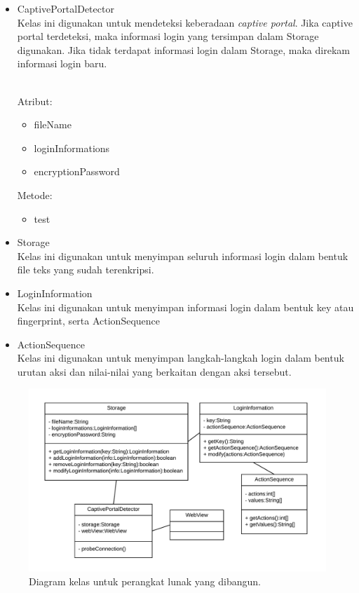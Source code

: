 \begin{itemize}
    \item{CaptivePortalDetector\\Kelas ini digunakan untuk mendeteksi keberadaan \textit{captive portal}. Jika captive portal terdeteksi, maka informasi login yang tersimpan dalam Storage digunakan. Jika tidak terdapat informasi login dalam Storage, maka direkam informasi login baru.}
    {
        \\Atribut:
        \begin{itemize}
            \item{fileName}
            \item{loginInformations}
            \item{encryptionPassword}
        \end{itemize}
        Metode:
        \begin{itemize}
            \item{test}
        \end{itemize}
    }
    \item{Storage\\Kelas ini digunakan untuk menyimpan seluruh informasi login dalam bentuk file teks yang sudah terenkripsi.}
    \item{LoginInformation\\Kelas ini digunakan untuk menyimpan informasi login dalam bentuk key atau fingerprint, serta ActionSequence}
    \item{ActionSequence\\Kelas ini digunakan untuk menyimpan langkah-langkah login dalam bentuk urutan aksi dan nilai-nilai yang berkaitan dengan aksi tersebut.}
\end{itemize}

\begin{figure}[h]
    \centering
    \includegraphics[scale=0.85]{Gambar/classdiagram.png}
    \caption[Diagram kelas untuk perangkat lunak yang dibangun.]{Diagram kelas untuk perangkat lunak yang dibangun.}
    \label{fig:diagramkelas}
\end{figure}

